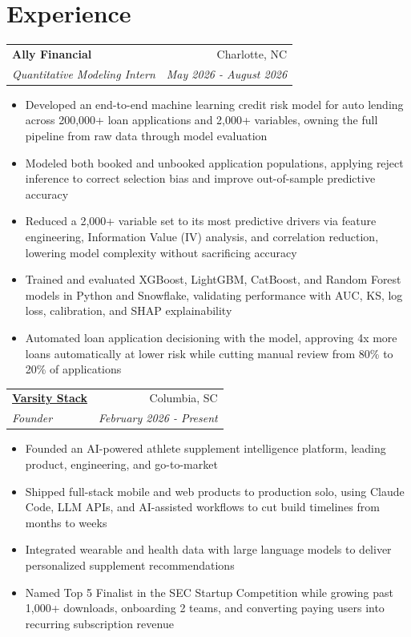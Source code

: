 \documentclass[letterpaper,10pt]{article}
\makeatletter
\newcommand{\localtextbulletone}{\textcolor{black}{\raisebox{.45ex}{\rule{.6ex}{.6ex}}}\hspace{8pt}}
\newcommand{\resumeItemSimple}[1]{
  \vspace{0pt}
  \item[\localtextbulletone]{
    {#1}\\
  }\vspace{-4pt}
}
\newcommand{\resumeSubheading}[4]{
    \vspace{-1pt}
    \begin{tabular*}{1\textwidth}{l@{\extracolsep{\fill}}r}
      \textbf{#1} & #2 \\
      \textit{\small#3} & \textit{\small #4} \\
    \end{tabular*}\vspace{-5pt}
}
\newcommand{\experienceItemDivider}{
  \vspace{8pt}
}
\newcommand{\resumeItemListStart}{\begin{itemize}[leftmargin=18pt,topsep=2pt,itemsep=2pt,parsep=0pt]}
\newcommand{\resumeItemListEnd}{\end{itemize}\vspace{-2pt}}
\makeatother
\begin{document}
\section{Experience}
    \resumeSubheading
      {Ally Financial}{Charlotte, NC}
      {Quantitative Modeling Intern}{May 2026 - August 2026}
      \resumeItemListStart
        \resumeItemSimple
          {Developed an end-to-end machine learning credit risk model for auto lending across 200,000+ loan applications and 2,000+ variables, owning the full pipeline from raw data through model evaluation}
        \resumeItemSimple
          {Modeled both booked and unbooked application populations, applying reject inference to correct selection bias and improve out-of-sample predictive accuracy}
        \resumeItemSimple
          {Reduced a 2,000+ variable set to its most predictive drivers via feature engineering, Information Value (IV) analysis, and correlation reduction, lowering model complexity without sacrificing accuracy}
        \resumeItemSimple
          {Trained and evaluated XGBoost, LightGBM, CatBoost, and Random Forest models in Python and Snowflake, validating performance with AUC, KS, log loss, calibration, and SHAP explainability}
        \resumeItemSimple
          {Automated loan application decisioning with the model, approving 4x more loans automatically at lower risk while cutting manual review from 80\% to 20\% of applications}
      \resumeItemListEnd
    \experienceItemDivider
    \resumeSubheading
      {\href{https://varsitystack.com}{Varsity Stack}}{Columbia, SC}
      {Founder}{February 2026 - Present}
      \resumeItemListStart
        \resumeItemSimple
          {Founded an AI-powered athlete supplement intelligence platform, leading product, engineering, and go-to-market}
        \resumeItemSimple
          {Shipped full-stack mobile and web products to production solo, using Claude Code, LLM APIs, and AI-assisted workflows to cut build timelines from months to weeks}
        \resumeItemSimple
          {Integrated wearable and health data with large language models to deliver personalized supplement recommendations}
        \resumeItemSimple
          {Named Top 5 Finalist in the SEC Startup Competition while growing past 1,000+ downloads, onboarding 2 teams, and converting paying users into recurring subscription revenue}
      \resumeItemListEnd
\end{document}
